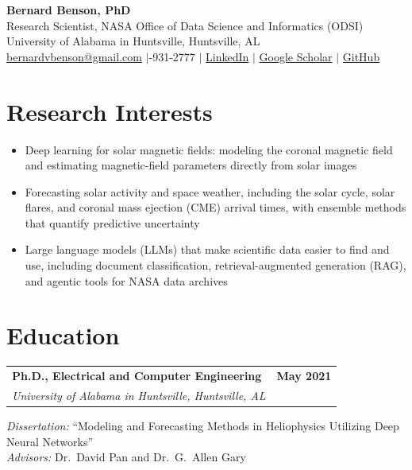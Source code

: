 \documentclass[11pt,letterpaper]{article}
\makeatletter
\newcommand{\cventry}[3]{%
  \par\needspace{5\baselineskip}\vspace{0.6ex}%
  \noindent\begin{tabularx}{\textwidth}{@{}X r@{}}
    \textbf{#1} & \textbf{#3}\\
    \textit{#2} & \\
  \end{tabularx}%
  \vspace{-0.4ex}%
}
\makeatother
\begin{document}
\thispagestyle{plain}

\begin{center}
  {\LARGE\bfseries Bernard Benson, PhD}\\[0.5ex]
  {\normalsize Research Scientist, NASA Office of Data Science and Informatics (ODSI)\\
   University of Alabama in Huntsville, Huntsville, AL}\\[0.6ex]
  {\small
    \href{mailto:bernardvbenson@gmail.com}{bernardvbenson@gmail.com}
    \;$|$-931-2777
    \;$|$\; \href{https://www.linkedin.com/in/bernardbenson}{LinkedIn}
    \;$|$\; \href{https://scholar.google.com/citations?user=uiHWfLEAAAAJ}{Google Scholar}
    \;$|$\; \href{https://github.com/bernardbenson}{GitHub}
  }
\end{center}
\vspace{0.4ex}

\section{Research Interests}
\begin{itemize}
  \item Deep learning for solar magnetic fields: modeling the coronal magnetic field and
        estimating magnetic-field parameters directly from solar images
  \item Forecasting solar activity and space weather, including the solar cycle, solar flares,
        and coronal mass ejection (CME) arrival times, with ensemble methods that quantify
        predictive uncertainty
  \item Large language models (LLMs) that make scientific data easier to find and use,
        including document classification, retrieval-augmented generation (RAG), and agentic
        tools for NASA data archives
\end{itemize}

\section{Education}
\cventry{Ph.D., Electrical and Computer Engineering}{University of Alabama in Huntsville, Huntsville, AL}{May 2021}
\par\noindent\textit{Dissertation:} ``Modeling and Forecasting Methods in Heliophysics Utilizing Deep Neural Networks''\\
\textit{Advisors:} Dr.~David Pan and Dr.~G.~Allen Gary
\end{document}
